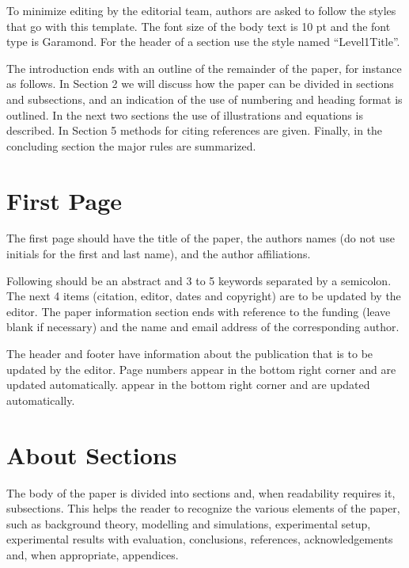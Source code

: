 \documentclass[10pt]{imeko_acta}
\begin{document}
To minimize editing by the editorial team, authors are asked 
to follow the styles that go with this template. The font size of 
the body text is 10 pt and the font type is Garamond. For the 
header of a section use the style named “Level1Title”.

The introduction ends with an outline of the remainder of the 
paper, for instance as follows. In Section 2 we will discuss how 
the paper can be divided in sections and subsections, and an 
indication of the use of numbering and heading format is 
outlined. In the next two sections the use of illustrations and 
equations is described. In Section 5 methods for citing references 
are given. Finally, in the concluding section the major rules are 
summarized.\vfill\par

\section{First Page}

The first page should have the title of the paper, the authors names (do not use initials for the first and last name), and the author affiliations.

Following should be an abstract and 3 to 5 keywords separated by a semicolon. The next 4 items (citation, editor, dates and copyright) are to be updated by the editor. The paper information section ends with reference to the funding (leave blank if necessary) and the name and email address of the corresponding author. %

The header and footer have information about the publication that is to be updated by the editor. Page numbers appear in the bottom right corner and are updated automatically. appear in the bottom right corner and are updated automatically.

\section{About Sections}

The body of the paper is divided into sections and, when readability requires it, subsections. This helps the reader to recognize the various elements of the paper, such as background theory, modelling and simulations, experimental setup, experimental results with evaluation, conclusions, references, acknowledgements and, when appropriate, appendices. 
\end{document}
